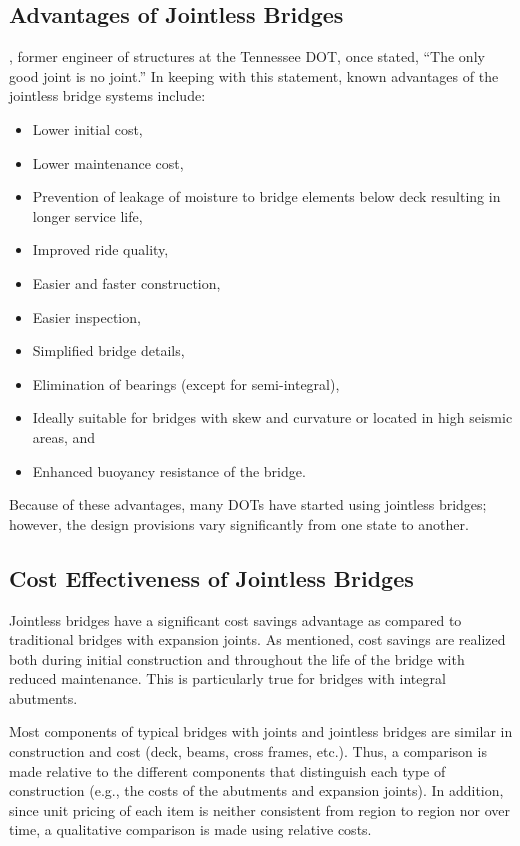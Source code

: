 \subsection{Advantages of Jointless Bridges}
, former engineer of structures at the Tennessee DOT, once stated, “The only good joint is no joint.” In keeping with this statement, known advantages of the jointless bridge systems include:

\begin{itemize}
  \item Lower initial cost,
  \item Lower maintenance cost,
  \item Prevention of leakage of moisture to bridge elements below deck resulting in longer service life,
  \item Improved ride quality,
  \item Easier and faster construction,
  \item Easier inspection,
  \item Simplified bridge details,
  \item Elimination of bearings (except for semi-integral),
  \item Ideally suitable for bridges with skew and curvature or located in high seismic areas, and
  \item Enhanced buoyancy resistance of the bridge.
\end{itemize}

Because of these advantages, many DOTs have started using jointless bridges; however, the design provisions vary significantly from one state to another.

\subsection{Cost Effectiveness of Jointless Bridges}

Jointless bridges have a significant cost savings advantage as compared to traditional bridges with expansion
joints. As mentioned, cost savings are realized both during initial construction and throughout the life of the bridge
with reduced maintenance. This is particularly true for bridges with integral abutments.

Most components of typical bridges with joints and jointless bridges are similar in construction and cost (deck,
beams, cross frames, etc.). Thus, a comparison is made relative to the different components that distinguish each type
of construction (e.g., the costs of the abutments and expansion joints). In addition, since unit pricing of each item is
neither consistent from region to region nor over time, a qualitative comparison is made using relative costs.

